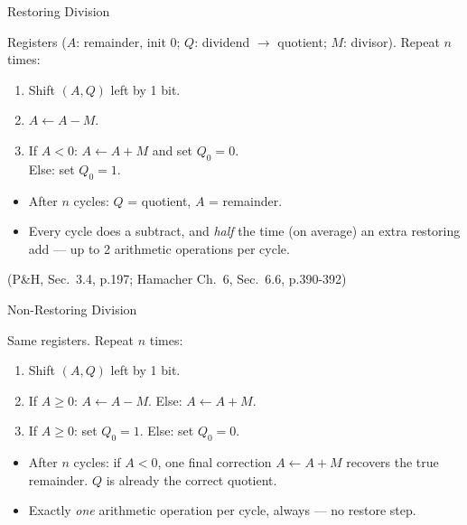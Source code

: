 \documentclass[aspectratio=169]{beamer}
\begin{document}
\begin{frame}{Restoring Division}
  \begin{block}{Registers ($A$: remainder, init $0$; $Q$: dividend $\to$
    quotient; $M$: divisor). Repeat $n$ times:}
    \begin{enumerate}
      \item Shift $(A,Q)$ left by 1 bit.
      \item $A \gets A - M$.
      \item If $A < 0$:  $A \gets A + M$ and set $Q_0 = 0$.
        \\ Else: set $Q_0 = 1$.
    \end{enumerate}
  \end{block}
  \begin{itemize}
    \item After $n$ cycles: $Q$ = quotient, $A$ = remainder.
    \item Every cycle does a subtract, and \emph{half} the time (on average)
      an extra restoring add --- up to 2 arithmetic operations per cycle.
  \end{itemize}
  (P\&H, Sec.~3.4, p.197; Hamacher Ch.~6, Sec.~6.6, p.390-392)
  \cite{PattersonHennessy2017_computer_organization_design,Hamacher2002_computer_organization}
\end{frame}

\begin{frame}{Non-Restoring Division}
  \begin{block}{Same registers. Repeat $n$ times:}
    \begin{enumerate}
      \item Shift $(A,Q)$ left by 1 bit.
      \item If $A \ge 0$: $A \gets A - M$. \quad Else: $A \gets A + M$.
      \item If $A \ge 0$: set $Q_0 = 1$. \quad Else: set $Q_0 = 0$.
    \end{enumerate}
  \end{block}
  \begin{itemize}
    \item After $n$ cycles: if $A < 0$, one final correction $A \gets A + M$
      recovers the true remainder. $Q$ is already the correct quotient.
    \item Exactly \emph{one} arithmetic operation per cycle, always --- no
      restore step.
  \end{itemize}
\end{frame}
\end{document}
